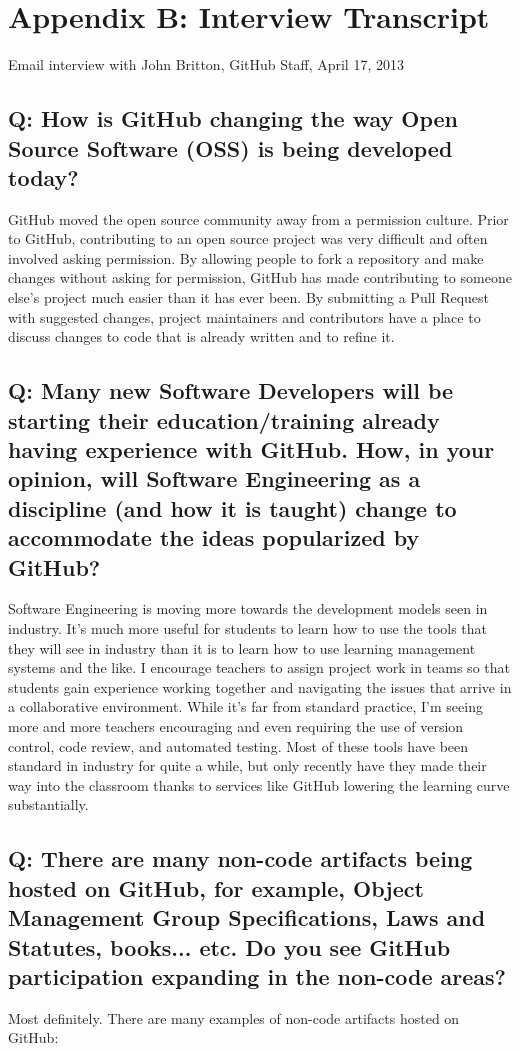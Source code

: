 \clearpage

\section*{Appendix B: Interview Transcript}
Email interview with John Britton, GitHub Staff, April 17, 2013

\subsection*{Q: How is GitHub changing the way Open Source Software (OSS) is being developed today?}
GitHub moved the open source community away from a permission culture. Prior to GitHub, contributing to an open source project was very difficult and often involved asking permission. By allowing people to fork a repository and make changes without asking for permission, GitHub has made contributing to someone else's project much easier than it has ever been. By submitting a Pull Request with suggested changes, project maintainers and contributors have a place to discuss changes to code that is already written and to refine it.

\subsection*{Q: Many new Software Developers will be starting their education/training already having experience with GitHub. How, in your opinion, will Software Engineering as a discipline (and how it is taught) change to accommodate the ideas popularized by GitHub?}

Software Engineering is moving more towards the development models seen in industry. It's much more useful for students to learn how to use the tools that they will see in industry than it is to learn how to use learning management systems and the like. I encourage teachers to assign project work in teams so that students gain experience working together and navigating the issues that arrive in a collaborative environment. While it's far from standard practice, I'm seeing more and more teachers encouraging and even requiring the use of version control, code review, and automated testing. Most of these tools have been standard in industry for quite a while, but only recently have they made their way into the classroom thanks to services like GitHub lowering the learning curve substantially.

\subsection*{Q: There are many non-code artifacts being hosted on GitHub, for example, Object Management Group Specifications, Laws and Statutes, books... etc. Do you see GitHub participation expanding in the non-code areas?}
Most definitely. There are many examples of non-code artifacts hosted on GitHub:

